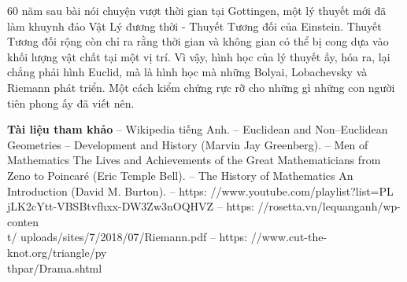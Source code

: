 \begin{multicols}{2}
	60 năm sau bài nói chuyện vượt thời gian tại Gottingen, một lý thuyết mới đã làm khuynh đảo Vật Lý đương thời - Thuyết Tương đối của Einstein. Thuyết Tương đối rộng còn chỉ ra rằng thời gian và không gian có thể bị cong dựa vào khối lượng vật chất tại một vị trí. Vì vậy, hình học của lý thuyết ấy, hóa ra, lại chẳng phải hình Euclid, mà là hình học mà những Bolyai, Lobachevsky và Riemann phát triển. Một cách kiểm chứng rực rỡ cho những gì những con người tiên phong ấy đã viết nên.
		
		
	\vskip 0.1cm
	\textbf{\color{lichsutoanhoc}\color{lichsutoanhoc}Tài liệu tham khảo}
	\vskip 0.1cm
	-- Wikipedia tiếng Anh.
	\vskip 0.1cm
	-- Euclidean and Non--Euclidean Geometries -- Development and History (Marvin Jay Greenberg).
	\vskip 0.1cm
	-- Men of Mathematics The Lives and Achievements of the Great Mathematicians from Zeno to Poincaré (Eric Temple Bell).
	\vskip 0.1cm
	-- The History of Mathematics An Introduction (David M. Burton).
	\vskip 0.1cm
	-- https: //www.youtube.com/playlist?list=PL\\jLK2cYtt-VBSBtvfhxx-DW3Zw3nOQHVZ
	\vskip 0.1cm
	-- https: //rosetta.vn/lequanganh/wp-conten\\t/
	uploads/sites/7/2018/07/Riemann.pdf
	\vskip 0.1cm
	-- https: //www.cut-the-knot.org/triangle/py\\
	thpar/Drama.shtml
\end{multicols}
